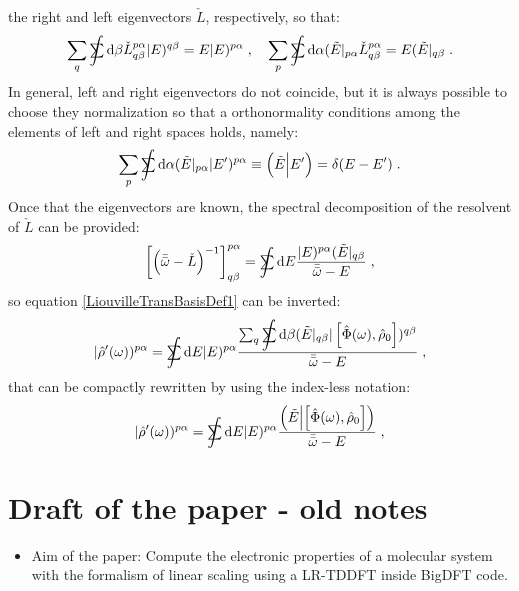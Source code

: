 \documentclass[a4paper]{article}
\newcommand{\dd}{{\rm d}}
\newcommand{\bbomega}{{\bar{\bar\omega}}}
\newcommand{\sint}{\mathrlap{\displaystyle\int}
\mathrlap{\textstyle\sum}
\phantom{\mathrlap{\displaystyle
\int}\textstyle\sum}}
\newcommand{\be}{\begin{equation}}
\newcommand{\ee}{\end{equation}}
\newcommand{\lb}{\label}
\newcommand{\mat}[1]{\begin{pmatrix} #1\end{pmatrix}}
\newcommand{\op}[1]{\hat {#1}}
\newcommand{\commutator}[2]{\left[ {#1} , {#2} \right]}
\newcommand{\optr}[1]{\check #1}
\newcommand{\sket}[2]{| #2)^{#1}}
\newcommand{\sbra}[2]{( #2|_{#1}}
\newcommand{\dbraket}[2]{\Bigl(#1 \Bigl| #2 \Bigr)}
\newcommand{\dmnot}{\op{\rho}_0}
\newcommand{\dm}{\op{\rho}}
\begin{document}
the right and left eigenvectors $\optr{L}$, respectively, so that:
\be\lb{LiouvMatrixEigenvectorDef1}
\sum_q \sint \dd \beta \optr{L}^{p \alpha}_{q\beta} \sket{q \beta}{E} = E \sket{p\alpha}{E} \;, \quad
\sum_p \sint \dd \alpha \sbra{p\alpha}{\tilde E} \optr{L}^{p \alpha}_{q\beta} = E \sbra{q\beta}{\tilde E}\;.
\ee
In general, left and right eigenvectors do not coincide, but it is always possible to choose they normalization so that a orthonormality conditions among the
elements of left and right spaces holds, namely:
\be
\sum_p \sint \dd \alpha \sbra{p\alpha}{\tilde E}\sket{p\alpha}{E'} \equiv \dbraket{\tilde E}{E'} = \delta(E-E') \;.
\ee
Once that the eigenvectors are known, the spectral decomposition of the resolvent of $\optr{L}$ can be provided:  
\be
\left[\left(\bbomega-\optr{L}\right)^{-1}\right]^{p\alpha}_{q\beta} =\sint\dd E
\frac{\sket{p\alpha}{E}\sbra{q\beta}{\tilde E}}{\bbomega-E} \;,
\ee
so equation \eqref{LiouvilleTransBasisDef1} can be inverted:
\be
\sket{p\alpha}{\dm'(\omega)} = 
\sint\dd E \sket{p\alpha}{E}
\frac{\sum_q \sint \dd \beta\sbra{q\beta}{\tilde E}
\sket{q\beta}{\commutator{\op\Phi(\omega)}{\dmnot}}}{\bbomega-E} \;,
\ee
that can be compactly rewritten by using the index-less notation:
\be
\sket{p\alpha}{\dm'(\omega)} = 
\sint\dd E \sket{p\alpha}{E}
\frac{\dbraket{\tilde E}{\commutator{\op\Phi(\omega)}{\dmnot}}}{\bbomega-E} \;,
\ee
















\section{Draft of the paper - old notes}

\begin{itemize}
\item Aim of the paper: Compute the electronic properties of a molecular system with the formalism of linear scaling using a LR-TDDFT inside BigDFT code. 
\end{itemize}
\end{document}
